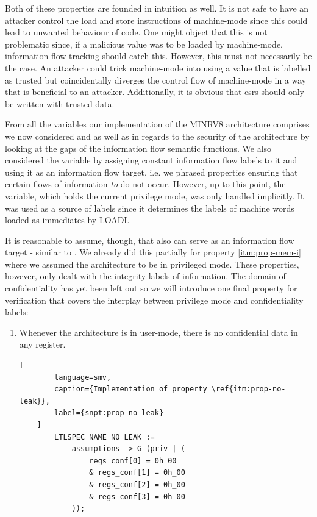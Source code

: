 Both of these properties are founded in intuition as well.
It is not safe to have an attacker control the load and store instructions of machine-mode since this could lead to unwanted behaviour of code.
One might object that this is not problematic since, if a malicious value was to be loaded by machine-mode, information flow tracking should catch this.
However, this must not necessarily be the case.
An attacker could trick machine-mode into using a value that is labelled as trusted but coincidentally diverges the control flow of machine-mode in a way that is beneficial to an attacker.
Additionally, it is obvious that \glspl{csr} should only be written with trusted data.

From all the variables our implementation of the MINRV8 architecture comprises we now considered  and  as well as  in regards to the security of the architecture by looking at the gaps of the information flow semantic functions.
We also considered the variable  by assigning constant information flow labels to it and using it as an information flow target, i.e. we phrased properties ensuring that certain flows of information \textit{to}  do not occur.
However, up to this point, the  variable, which holds the current privilege mode, was only handled implicitly.
It was used as a source of labels since it determines the labels of machine words loaded as immediates by LOADI.

It is reasonable to assume, though, that  also can serve as an information flow target - similar to .
We already did this partially for property \ref{itm:prop-mem-i} where we assumed the architecture to be in privileged mode.
These properties, however, only dealt with the integrity labels of information.
The domain of confidentiality has yet been left out so we will introduce one final property for verification that covers the interplay between privilege mode and confidentiality labels:
\begin{enumerate}[label=\Roman*.,resume]
    \item \label{itm:prop-no-leak}
    Whenever the architecture is in user-mode, there is no confidential data in any register.

    \begin{lstlisting}[
        language=smv,
        caption={Implementation of property \ref{itm:prop-no-leak}},
        label={snpt:prop-no-leak}
    ]
        LTLSPEC NAME NO_LEAK :=
            assumptions -> G (priv | (
                regs_conf[0] = 0h_00
                & regs_conf[1] = 0h_00
                & regs_conf[2] = 0h_00
                & regs_conf[3] = 0h_00
            ));
    \end{lstlisting}
\end{enumerate}

